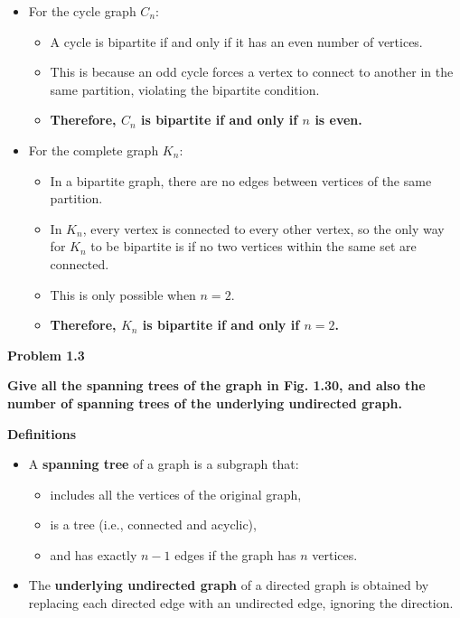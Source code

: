 \documentclass{article}
\begin{document}
\begin{itemize}
    \item For the cycle graph $C_n$:
    \begin{itemize}
        \item A cycle is bipartite if and only if it has an even number of vertices.
        \item This is because an odd cycle forces a vertex to connect to another in the same partition, violating the bipartite condition.
        \item \textbf{Therefore, $C_n$ is bipartite if and only if $n$ is even.}
    \end{itemize}
    
    \item For the complete graph $K_n$:
    \begin{itemize}
        \item In a bipartite graph, there are no edges between vertices of the same partition.
        \item In $K_n$, every vertex is connected to every other vertex, so the only way for $K_n$ to be bipartite is if no two vertices within the same set are connected.
        \item This is only possible when $n = 2$.
        \item \textbf{Therefore, $K_n$ is bipartite if and only if $n = 2$.}
    \end{itemize}
\end{itemize}

\textbf{Problem 1.3}

\textbf{Give all the spanning trees of the graph in Fig. 1.30, and also the number of spanning trees of the underlying undirected graph.}

\textbf{Definitions}

\begin{itemize}
    \item A \textbf{spanning tree} of a graph is a subgraph that:
    \begin{itemize}
        \item includes all the vertices of the original graph,
        \item is a tree (i.e., connected and acyclic),
        \item and has exactly $n - 1$ edges if the graph has $n$ vertices.
    \end{itemize}

    \item The \textbf{underlying undirected graph} of a directed graph is obtained by replacing each directed edge with an undirected edge, ignoring the direction.
\end{itemize}
\end{document}
